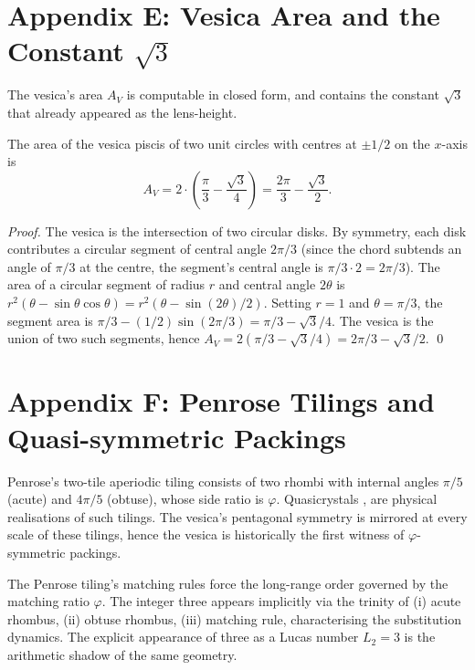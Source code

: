 \section*{Appendix E: Vesica Area and the Constant $\sqrt 3$}
\label{fa_01:sec:01-app-E}

The vesica's area $A_V$ is computable in closed form, and contains
the constant $\sqrt 3$ that already appeared as the lens-height.

\begin{lemma}\label{fa_01:lem:01-vesica-area}
The area of the vesica piscis of two unit circles with centres at
$\pm 1/2$ on the $x$-axis is
\[
  A_V = 2 \cdot \left( \frac{\pi}{3} - \frac{\sqrt{3}}{4} \right) =
  \frac{2 \pi}{3} - \frac{\sqrt{3}}{2}.
\]
\end{lemma}

\begin{proof}
The vesica is the intersection of two circular disks. By symmetry,
each disk contributes a circular segment of central angle $2 \pi / 3$
(since the chord subtends an angle of $\pi/3$ at the centre, the
segment's central angle is $\pi/3 \cdot 2 = 2 \pi / 3$). The area of
a circular segment of radius $r$ and central angle $2\theta$ is $r^2
(\theta - \sin\theta \cos\theta) = r^2 (\theta - \sin(2\theta)/2)$.
Setting $r = 1$ and $\theta = \pi/3$, the segment area is $\pi/3 -
(1/2) \sin(2\pi/3) = \pi/3 - \sqrt 3 /4$. The vesica is the union of
two such segments, hence $A_V = 2 (\pi/3 - \sqrt 3/4) = 2\pi/3 -
\sqrt 3 /2$.
\qed
\end{proof}

\section*{Appendix F: Penrose Tilings and Quasi-symmetric Packings}
\label{fa_01:sec:01-app-F}

Penrose's two-tile aperiodic tiling \cite{penrose1974} consists of
two rhombi with internal angles $\pi/5$ (acute) and $4 \pi /5$
(obtuse), whose side ratio is $\varphi$. Quasicrystals
\cite{shechtman1984}, \cite{senechal_quasicrystals} are physical
realisations of such tilings. The vesica's pentagonal symmetry is
mirrored at every scale of these tilings, hence the vesica is
historically the first witness of $\varphi$-symmetric packings.

\begin{remark}
The Penrose tiling's matching rules force the long-range order
governed by the matching ratio $\varphi$. The integer three appears
implicitly via the trinity of (i) acute rhombus, (ii) obtuse rhombus,
(iii) matching rule, characterising the substitution dynamics. The
explicit appearance of three as a Lucas number $L_2 = 3$ is the
arithmetic shadow of the same geometry.
\end{remark}


